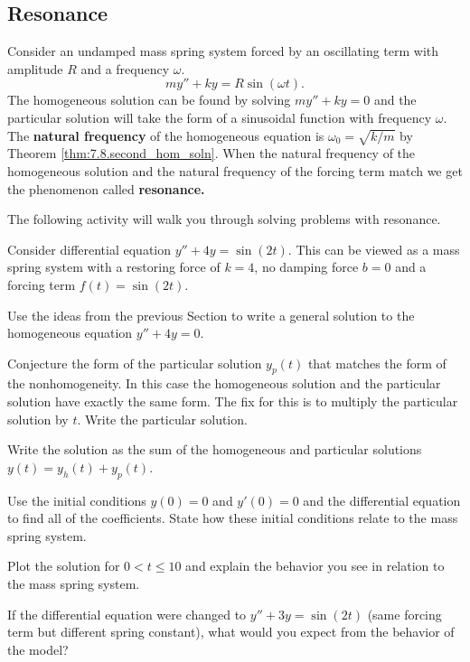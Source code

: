 \subsection*{Resonance}
Consider an undamped mass spring system forced by an oscillating term with amplitude $R$
and a frequency $\omega$.
\[ my''+ ky = R \sin(\omega t). \]
The homogeneous solution can be found by solving $my''+ky=0$ and the particular solution
will take the form of a sinusoidal function with frequency $\omega$.  The {\bf natural
frequency} of the homogeneous equation is $\omega_0 = \sqrt{k/m}$ by Theorem
\ref{thm:7.8.second_hom_soln}.  When the natural frequency of the homogeneous solution and
the natural frequency of the forcing term match we get the phenomenon called {\bf
resonance.}

The following activity will walk you through solving problems with resonance.

% 
\begin{problem}
    Consider differential equation $y''+4y = \sin(2t)$. This can be viewed as a mass
    spring system with a restoring force of $k=4$, no damping force $b=0$ and a forcing
    term $f(t) = \sin(2t)$.
    \ba
        \item Use the ideas from the previous Section to write a general
            solution to the homogeneous equation $y''+4y=0$.
        \item Conjecture the form of the particular solution $y_p(t)$ that matches the
            form of the nonhomogeneity. In this case the homogeneous solution and the
            particular solution have exactly the same form.  The fix for this is to
            multiply the particular solution by $t$.  Write the particular solution.
        \item Write the solution as the sum of the homogeneous and particular solutions
            $y(t) = y_h(t) + y_p(t)$.
        \item Use the initial conditions $y(0) = 0$ and $y'(0) = 0$ and the differential
            equation to find all of the coefficients.  State how these initial conditions
            relate to the mass spring system.
        \item Plot the solution for $0<t\le 10$ and explain the behavior you see in
            relation to the mass spring system.
        \item If the differential equation were changed to $y''+3y=\sin(2t)$ (same forcing
            term but different spring constant), what would you expect from the behavior
            of the model?
    \ea
\end{problem}








